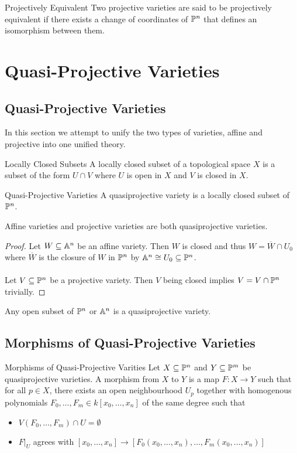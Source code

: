 \documentclass[a4paper]{article}
\begin{document}
\begin{defn}{Projectively Equivalent}{} Two projective varieties are said to be projectively equivalent if there exists a change of coordinates of $\mathbb{P}^n$ that defines an isomorphism between them. 
\end{defn}

\pagebreak
\section{Quasi-Projective Varieties}
\subsection{Quasi-Projective Varieties}
In this section we attempt to unify the two types of varieties, affine and projective into one unified theory. 

\begin{defn}{Locally Closed Subsets}{} A locally closed subset of a topological space $X$ is a subset of the form $U\cap V$ where $U$ is open in $X$ and $V$ is closed in $X$. 
\end{defn}

\begin{defn}{Quasi-Projective Varieties}{} A quasiprojective variety is a locally closed subset of $\mathbb{P}^n$. 
\end{defn}

\begin{lmm}{}{} Affine varieties and projective varieties are both quasiprojective varieties. \tcbline
\begin{proof}
Let $W\subseteq\mathbb{A}^n$ be an affine variety. Then $W$ is closed and thus $W=\overline{W}\cap U_0$ where $\overline{W}$ is the closure of $W$ in $\mathbb{P}^n$ by $\mathbb{A}^n\cong U_0\subseteq\mathbb{P}^n$. \\~\\
Let $V\subseteq\mathbb{P}^n$ be a projective variety. Then $V$ being closed implies $V=V\cap\mathbb{P}^n$ trivially. 
\end{proof}
\end{lmm}

\begin{lmm}{}{} Any open subset of $\mathbb{P}^n$ or $\mathbb{A}^n$ is a quasiprojective variety. 
\end{lmm}

\subsection{Morphisms of Quasi-Projective Varieties}
\begin{defn}{Morphisms of Quasi-Projective Varities}{} Let $X\subseteq\mathbb{P}^n$ and $Y\subseteq\mathbb{P}^m$ be quasiprojective varieties. A morphism from $X$ to $Y$  is a map $F:X\to Y$ such that for all $p\in X$, there exists an open neighbourhood $U_p$ together with homogenous polynomials $F_0,\dots,F_m\in k[x_0,\dots,x_n]$ of the same degree such that 
\begin{itemize}
\item $V(F_0,\dots,F_m)\cap U=\emptyset$
\item $F|_U$ agrees with $[x_0,\dots,x_n]\to[F_0(x_0,\dots,x_n),\dots,F_m(x_0,\dots,x_n)]$
\end{itemize}
\end{defn}
\end{document}
